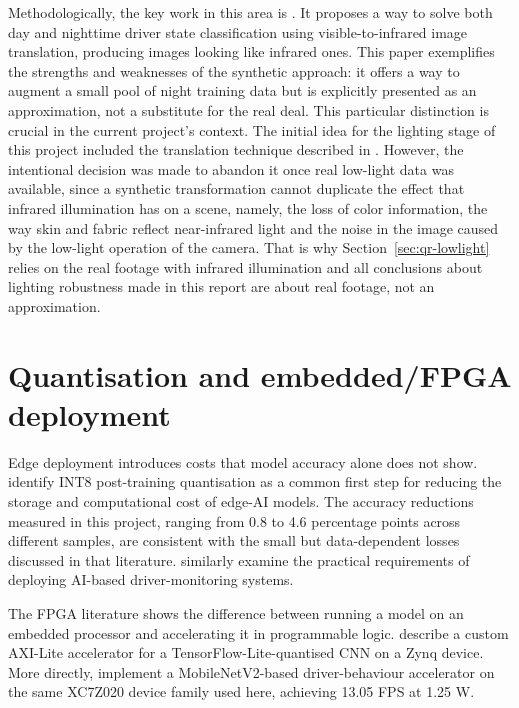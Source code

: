 Methodologically, the key work in this area is \citet{shen2023visible}. It proposes a way to solve both day and nighttime driver state classification using visible-to-infrared image translation, producing images looking like infrared ones. This paper exemplifies the strengths and weaknesses of the synthetic approach: it offers a way to augment a small pool of night training data but is explicitly presented as an approximation, not a substitute for the real deal. This particular distinction is crucial in the current project's context. The initial idea for the lighting stage of this project included the translation technique described in \citet{shen2023visible}. However, the intentional decision was made to abandon it once real low-light data was available, since a synthetic transformation cannot duplicate the effect that infrared illumination has on a scene, namely, the loss of color information, the way skin and fabric reflect near-infrared light and the noise in the image caused by the low-light operation of the camera. That is why Section~\ref{sec:qr-lowlight} relies on the real footage with infrared illumination and all conclusions about lighting robustness made in this report are about real footage, not an approximation.

\section{Quantisation and embedded/FPGA deployment}
\label{sec:lit-embedded}

Edge deployment introduces costs that model accuracy alone does not show. \citet{abushahla2025quantization} identify INT8 post-training quantisation as a common first step for reducing the storage and computational cost of edge-AI models. The accuracy reductions measured in this project, ranging from 0.8 to 4.6 percentage points across different samples, are consistent with the small but data-dependent losses discussed in that literature. \citet{hariharan2023edge} similarly examine the practical requirements of deploying AI-based driver-monitoring systems.

The FPGA literature shows the difference between running a model on an embedded processor and accelerating it in programmable logic. \citet{parra2023methodology} describe a custom AXI-Lite accelerator for a TensorFlow-Lite-quantised CNN on a Zynq device. More directly, \citet{lu2025hardware} implement a MobileNetV2-based driver-behaviour accelerator on the same XC7Z020 device family used here, achieving 13.05 FPS at 1.25 W.

